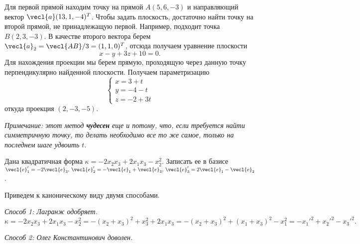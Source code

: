 Для первой прямой находим точку на прямой $A(5, 6, -3)$ и направляющий вектор $\vecl{a}(13, 1, -4)^T$. Чтобы задать плоскость, достаточно найти точку на второй прямой, не принадлежащую первой. Например, подходит точка $B(2, 3, -3)$. В качестве второго вектора берем $\vecl{a}_2 = \vecl{AB} / 3 = (1, 1, 0)^T$, отсюда получаем уравнение плоскости
\begin{equation*}
    x - y + 3z + 10 = 0.
\end{equation*}
Для нахождения проекции мы берем прямую, проходящую через данную точку перпендикулярно найденной плоскости. Получаем параметризацию
\begin{equation*}
    \begin{cases}
        x = 3 + t \\ y = -4 - t \\ z = -2 + 3t
    \end{cases}
\end{equation*}
откуда проекция $(2, -3, -5)$.

\textit{Примечание: этот метод \textbf{чудесен} еще и потому, что, если требуется найти симметричную точку, то делать необходимо все то же самое, только на последнем шаге удвоить $t$.}

\begin{task}
    Дана квадратичная форма $\kappa = -2x_2x_3 + 2x_1x_3 - x_2^2$. Записать ее в базисе $\vecl{e}_1' = -2\vecl{e}_3, \, \vecl{e}_2' = -\vecl{e}_1 + \vecl{e}_3, \, \vecl{e}_3' = 2\vecl{e}_1 - \vecl{e}_2$.
\end{task}

Приведем к каноническому виду двумя способами.

\textit{Способ 1: Лагранж одобряет.}
 \begin{equation*}
    \kappa = -2x_2x_3 + 2x_1x_3 - x_2^2 = -(x_2 + x_3)^2 + x_3^2 + 2x_1x_3 = -(x_2 + x_3)^2 + (x_1 + x_3)^2 - x_1^2 = -x_1'^2 + x_2'^2 - x_3'^2.
\end{equation*}

\textit{Способ 2: Олег Константинович доволен.}

